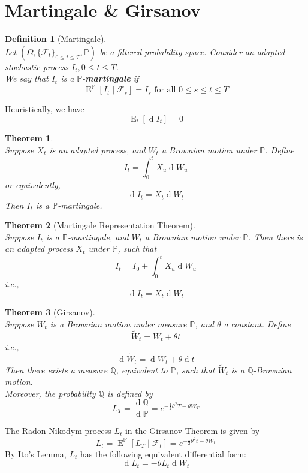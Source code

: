 \documentclass[12pt]{article}
\newtheorem{definition}{Definition}[section]
\newtheorem{theorem}{Theorem}[section]
\theoremstyle{definition}
\DeclareMathOperator{\diff}{d}
\DeclareMathOperator{\expec}{E}
\begin{document}
\section{Martingale \& Girsanov}
\begin{definition}[Martingale]
\hfill\\\normalfont Let $(\Omega, \{\mathcal{F}_t\}_{0\leq t\leq T}, \mathbb{P})$ be a filtered probability space. Consider an adapted stochastic process $I_t,0\leq t\leq T$. \\
We say that $I_t$ is a $\mathbb{P}$-\textbf{martingale} if
\[
\expec^\mathbb{P}[I_t\mid \mathcal{F}_s]=I_s\text{  for all }0\leq s\leq t\leq T
\]
\end{definition}
Heuristically, we have
\[
\expec_t[\diff I_t]=0
\]
\begin{theorem}
\hfill\\\normalfont Suppose $X_t$ is an adapted process, and $W_t$ a Brownian motion under $\mathbb{P}$. Define
\[
I_t=\int_0^t X_u\diff W_u
\]
or equivalently,
\[
\diff I_t=X_t\diff W_t
\]
Then $I_t$ is a $\mathbb{P}$-martingale.
\end{theorem}
\begin{theorem}[Martingale Representation Theorem]
\hfill\\\normalfont Suppose $I_t$ is a $\mathbb{P}$-martingale, and $W_t$ a Brownian motion under $\mathbb{P}$. Then there is an adapted process $X_t$ under $\mathbb{P}$, such that
\[
I_t=I_0+\int_0^t X_u\diff W_u
\]
i.e.,
\[
\diff I_t=X_t\diff W_t
\]
\end{theorem}
\begin{theorem}[Girsanov]
\hfill\\\normalfont Suppose $W_t$ is a Brownian motion under measure $\mathbb{P}$, and $\theta$ a constant. Define
\[
\tilde{W}_t=W_t+\theta t
\]
i.e.,
\[
\diff \tilde{W}_t=\diff W_t+\theta \diff t
\]
Then there exists a measure $\mathbb{Q}$, equivalent to $\mathbb{P}$, such that $\tilde{W}_t$ is a $\mathbb{Q}$-Brownian motion.\\
Moreover, the probability $\mathbb{Q}$ is defined by
\[
L_T=\frac{\diff \mathbb{Q}}{\diff \mathbb{P}} = e^{-\frac{1}{2}\theta^2T-\theta W_T}
\]
\end{theorem}
The Radon-Nikodym process $L_t$ in the Girsanov Theorem is given by
\[
L_t=\expec^\mathbb{P}[L_T\mid \mathcal{F}_t]=e^{-\frac{1}{2}\theta^2t-\theta W_t}
\]
By Ito's Lemma, $L_t$ has the following equivalent differential form:
\[
\diff L_t =-\theta L_t\diff W_t
\]
\end{document}
